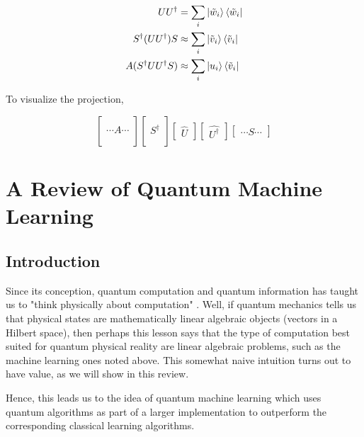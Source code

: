 \documentclass[main.tex]{subfiles}
\begin{document}
\begin{align*}
UU^\dag &= \sum_i \ket{\tilde{w}_i}\bra{\tilde{w}_i}	 \\
S^\dag(UU^\dag)S &\approx \sum_i \ket{\tilde{v}_i}\bra{\tilde{v}_i} \\
A(S^\dag UU^\dag S) &\approx \sum_i \ket{u_i} \bra{\tilde{v}_i}
\end{align*}

To visualize the projection,

$$
\begin{bmatrix}
\\
\cdots A \cdots 
\\
\\	
\end{bmatrix}
\begin{bmatrix}
\\
S^\dag
\\
\\	
\end{bmatrix}
\begin{bmatrix}
\hat{U}
\end{bmatrix}
\begin{bmatrix}
\hat{U^\dag}
\end{bmatrix}
\begin{bmatrix}
\cdots S \cdots
\end{bmatrix}
$$

\chapter{A Review of Quantum Machine Learning}

\section{Introduction}

Since its conception, quantum computation and quantum information has taught us to "think physically about computation" \cite{nielsen2010quantum}. Well, if quantum mechanics tells us that physical states are mathematically linear algebraic objects (vectors in a Hilbert space), then perhaps this lesson says that the type of computation best suited for quantum physical reality are linear algebraic problems, such as the machine learning ones noted above. This somewhat naive intuition turns out to have value, as we will show in this review.

Hence, this leads us to the idea of quantum machine learning which uses quantum algorithms as part of a larger implementation to outperform the corresponding classical learning algorithms.
\end{document}
